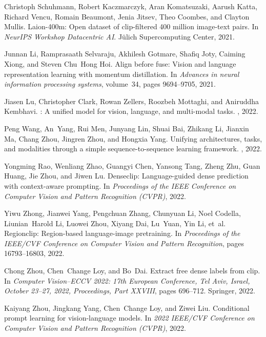 {\begin{thebibliography}{10}
Christoph Schuhmann, Robert Kaczmarczyk, Aran Komatsuzaki, Aarush Katta,
  Richard Vencu, Romain Beaumont, Jenia Jitsev, Theo Coombes, and Clayton
  Mullis.
\newblock Laion-400m: Open dataset of clip-filtered 400 million image-text
  pairs.
\newblock In {\em NeurIPS Workshop Datacentric AI}. J{\"u}lich Supercomputing
  Center, 2021.

Junnan Li, Ramprasaath Selvaraju, Akhilesh Gotmare, Shafiq Joty, Caiming Xiong,
  and Steven Chu~Hong Hoi.
\newblock Align before fuse: Vision and language representation learning with
  momentum distillation.
\newblock In {\em Advances in neural information processing systems},
  volume~34, pages 9694--9705, 2021.

Jiasen Lu, Christopher Clark, Rowan Zellers, Roozbeh Mottaghi, and Aniruddha
  Kembhavi.
: A unified model for vision, language, and multi-modal
  tasks.
, 2022.

Peng Wang, An~Yang, Rui Men, Junyang Lin, Shuai Bai, Zhikang Li, Jianxin Ma,
  Chang Zhou, Jingren Zhou, and Hongxia Yang.
\newblock Unifying architectures, tasks, and modalities through a simple
  sequence-to-sequence learning framework.
, 2022.

Yongming Rao, Wenliang Zhao, Guangyi Chen, Yansong Tang, Zheng Zhu, Guan Huang,
  Jie Zhou, and Jiwen Lu.
\newblock Denseclip: Language-guided dense prediction with context-aware
  prompting.
\newblock In {\em Proceedings of the IEEE Conference on Computer Vision and
  Pattern Recognition (CVPR)}, 2022.

Yiwu Zhong, Jianwei Yang, Pengchuan Zhang, Chunyuan Li, Noel Codella,
  Liunian~Harold Li, Luowei Zhou, Xiyang Dai, Lu~Yuan, Yin Li, et~al.
\newblock Regionclip: Region-based language-image pretraining.
\newblock In {\em Proceedings of the IEEE/CVF Conference on Computer Vision and
  Pattern Recognition}, pages 16793--16803, 2022.

Chong Zhou, Chen~Change Loy, and Bo~Dai.
\newblock Extract free dense labels from clip.
\newblock In {\em Computer Vision--ECCV 2022: 17th European Conference, Tel
  Aviv, Israel, October 23--27, 2022, Proceedings, Part XXVIII}, pages
  696--712. Springer, 2022.

Kaiyang Zhou, Jingkang Yang, Chen~Change Loy, and Ziwei Liu.
\newblock Conditional prompt learning for vision-language models.
\newblock In {\em 2022 {IEEE}/{CVF} Conference on Computer Vision and Pattern
  Recognition ({CVPR})}, 2022.


\end{thebibliography}}
